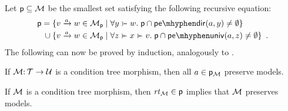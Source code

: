 %
Let ${\mathsf{p}}\subseteq {\mathcal{M}}$ be the smallest set satisfying the following recursive equation:
%
\begin{align*}
 \pgen = {} & \gensetof{\trip vaw\in \cM_\pgen}{\forall y\childof w\st \pgen\cap \pedir{a,y}\neq\emptyset} \\
   {}\cup{} & \gensetof{\trip vaw\in \cM_\pgen}{\forall z\childof x\childof v\st \pgen\cap \peuniv{a,z}\neq\emptyset} \enspace.
\end{align*}
%
The following can now be proved by induction, analogously to .
%
\begin{lemma}\label{lem:preservation}
If ${\mathcal{M}}{:}\,{\mathcal{T}}\rightarrow {\mathcal{U}}$ is a condition tree morphism, then all $a\in {\mathsf{p}}_{\mathcal{M}}$ preserve models.
\end{lemma}
%
\begin{corollary}
If ${\mathcal{M}}$ is a condition tree morphism, then $\mathit{rt}_{{\mathcal{M}}}\in{\mathsf{p}}$ implies that ${\mathcal{M}}$ preserves models.
\end{corollary}